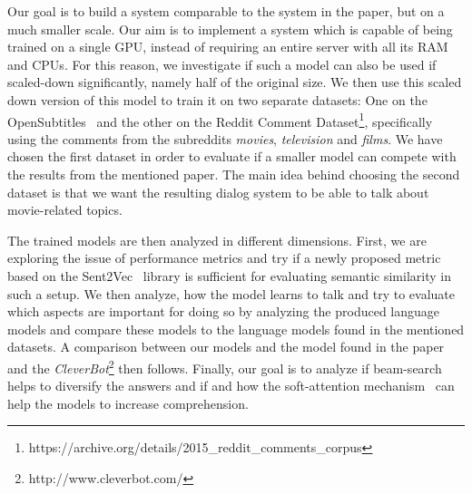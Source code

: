 Our goal is to build a system comparable to the system in the paper, but on a much smaller scale. Our aim is to implement a system which is capable of being trained on a single GPU, instead of requiring an entire server with all its RAM and CPUs. For this reason, we investigate if such a model can also be used if scaled-down significantly, namely half of the original size. We then use this scaled down version of this model to train it on two separate datasets: One on the OpenSubtitles~\cite{Lison:2016} and the other on the Reddit Comment Dataset\footnote{https://archive.org/details/2015\_reddit\_comments\_corpus}, specifically using the comments from the subreddits \emph{movies}, \emph{television} and \emph{films}. We have chosen the first dataset in order to evaluate if a smaller model can compete with the results from the mentioned paper. The main idea behind choosing the second dataset is that we want the resulting dialog system to be able to talk about movie-related topics.

The trained models are then analyzed in different dimensions. First, we are exploring the issue of performance metrics and try if a newly proposed metric based on the Sent2Vec~\cite{Pgj:2017} library is sufficient for evaluating semantic similarity in such a setup. We then analyze, how the model learns to talk and try to evaluate which aspects are important for doing so by analyzing the produced language models and compare these models to the language models found in the mentioned datasets. A comparison between our models and the model found in the paper and the \emph{CleverBot}\footnote{http://www.cleverbot.com/} then follows. Finally, our goal is to analyze if beam-search helps to diversify the answers and if and how the soft-attention mechanism~\cite{Bahdanau:2014} can help the models to increase comprehension.